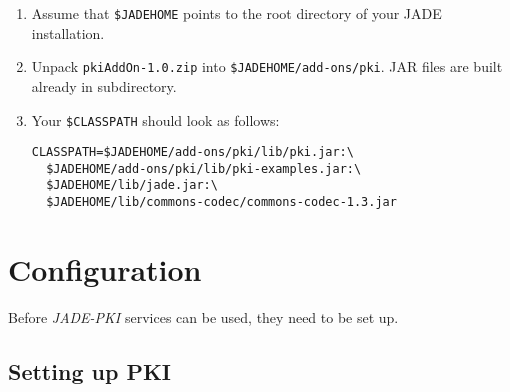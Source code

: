 \documentclass[a4paper,11pt]{article}
\begin{document}
\begin{enumerate}

  \item Assume that \texttt{\$JADEHOME} points to the root directory of
    your JADE installation.

  \item Unpack \texttt{pkiAddOn-1.0.zip} into \texttt{\$JADEHOME/add-ons/pki}.
    JAR files are built already in  subdirectory.

  \item   Your \texttt{\$CLASSPATH} should look as follows:

    \begin{verbatim}
CLASSPATH=$JADEHOME/add-ons/pki/lib/pki.jar:\
  $JADEHOME/add-ons/pki/lib/pki-examples.jar:\
  $JADEHOME/lib/jade.jar:\
  $JADEHOME/lib/commons-codec/commons-codec-1.3.jar
    \end{verbatim}

\end{enumerate}

\section{Configuration}

Before \textit{JADE-PKI} services can be used, they need to be set up.

\subsection{Setting up PKI}
\end{document}
